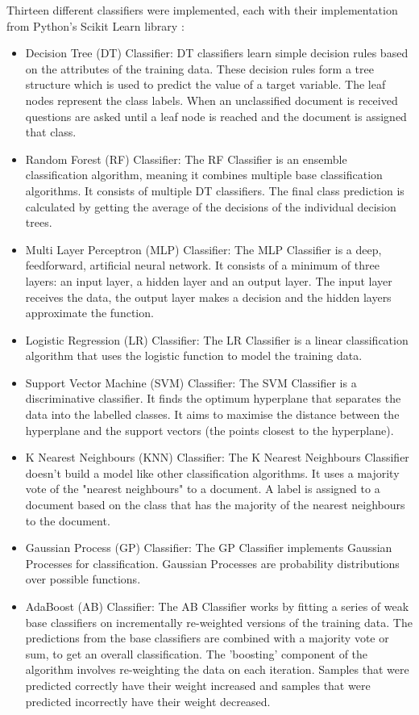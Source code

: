 Thirteen different classifiers were implemented, each with their implementation from Python's Scikit Learn library \cite{scikit-learn}:
\begin{itemize}
    \item Decision Tree (DT) Classifier: DT classifiers learn simple decision rules based on the attributes of the training data. These decision rules form a tree structure which is used to predict the value of a target variable. The leaf nodes represent the class labels. When an unclassified document is received questions are asked until a leaf node is reached and the document is assigned that class.
    \item Random Forest (RF) Classifier: The RF Classifier is an ensemble classification algorithm, meaning it combines multiple base classification algorithms. It consists of multiple DT classifiers. The final class prediction is calculated by getting the average of the decisions of the individual decision trees.
    \item Multi Layer Perceptron (MLP) Classifier: The MLP Classifier is a deep, feedforward, artificial neural network. It consists of a minimum of three layers: an input layer, a hidden layer and an output layer. The input layer receives the data, the output layer makes a decision and the hidden layers approximate the function.
    \item Logistic Regression (LR) Classifier: The LR Classifier is a linear classification algorithm that uses the logistic function to model the training data. 
    \item Support Vector Machine (SVM) Classifier: The SVM Classifier is a discriminative classifier. It finds the optimum hyperplane that separates the data into the labelled classes. It aims to maximise the distance between the hyperplane and the support vectors (the points closest to the hyperplane).
    \item K Nearest Neighbours (KNN) Classifier: The K Nearest Neighbours Classifier doesn't build a model like other classification algorithms. It uses a majority vote of the "nearest neighbours" to a document. A label is assigned to a document based on the class that has the majority of the nearest neighbours to the document.
    \item Gaussian Process (GP) Classifier: The GP Classifier implements Gaussian Processes for classification. Gaussian Processes are probability distributions over possible functions.
    \item AdaBoost (AB) Classifier: The AB Classifier works by fitting a series of weak base classifiers on incrementally re-weighted versions of the training data. The predictions from the base classifiers are combined with a majority vote or sum, to get an overall classification. The 'boosting' component of the algorithm involves re-weighting the data on each iteration. Samples that were predicted correctly have their weight increased and samples that were predicted incorrectly have their weight decreased.

\end{itemize}
